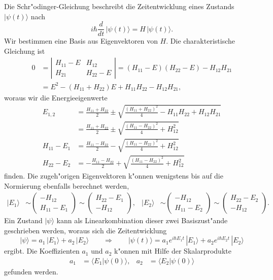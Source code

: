 Die Schr"odinger-Gleichung beschreibt die Zeitentwicklung eines
Zustands $|\psi(t)\rangle$ nach
\[
i\hbar\frac{d}{dt}\,|\psi(t)\rangle = H\, |\psi(t)\rangle.
\]
Wir bestimmen eine Basis aus Eigenvektoren von $H$.
Die charakteristische Gleichung ist
\begin{align*}
0&=
\left|\begin{matrix}
H_{11}-E&H_{12}\\
H_{21}&H_{22}-E
\end{matrix}\right|
=
(H_{11}-E)(H_{22}-E)-H_{12}H_{21}
\\
&=
E^2 - (H_{11}+H_{22})E + H_{11}H_{22}-H_{12}H_{21},
\end{align*}
woraus wir die Energieeigenwerte
\begin{align*}
E_{1,2}
&=
\frac{H_{11}+H_{22}}2\pm\sqrt{\frac{(H_{11}+H_{22})^2}4-H_{11}H_{22}+H_{12}H_{21}}
\\
&=
\frac{H_{11}+H_{22}}2\pm\sqrt{\frac{(H_{11}-H_{22})^2}4+H_{12}^2}
\\
H_{11}-E_1
&=
\frac{H_{11}-H_{22}}2-\sqrt{\frac{(H_{11}-H_{22})^2}4+H_{12}^2}
\\
H_{22}-E_2
&=
-\frac{H_{11}-H_{22}}2+\sqrt{\frac{(H_{11}-H_{22})^2}4+H_{12}^2}
\end{align*}
finden.
Die zugeh"origen Eigenvektoren k"onnen wenigstens bis auf die Normierung
ebenfalls berechnet werden,
\begin{align*}
|E_1\rangle
&\sim
\begin{pmatrix}
  -H_{12} \\
H_{11}-E_1
\end{pmatrix}
\sim
\begin{pmatrix}
H_{22}-E_1 \\
   -H_{12}
\end{pmatrix},
&
|E_2\rangle
&\sim
\begin{pmatrix}
   -H_{12} \\
H_{11}-E_2
\end{pmatrix}
\sim
\begin{pmatrix}
H_{22}-E_2 \\
   -H_{12}
\end{pmatrix}.
\end{align*} 
Ein Zustand $|\psi\rangle$ kann als Linearkombination dieser zwei
Basiszust"ande geschrieben werden, woraus sich die Zeitentwicklung
\[
|\psi\rangle
=
a_1\,|E_1\rangle
+
a_2\,|E_2\rangle
\qquad\Rightarrow\qquad
|\psi(t)\rangle
=
a_1e^{i\hbar E_1t}\,|E_1\rangle
+
a_2e^{i\hbar E_2t}\,|E_2\rangle
\]
ergibt.
Die Koeffizienten $a_1$ und $a_2$ k"onnen mit Hilfe der Skalarprodukte
\begin{align*}
a_1&=\langle E_1|\psi(0)\rangle,
&
a_2&=\langle E_2|\psi(0)\rangle
\end{align*}
gefunden werden.

